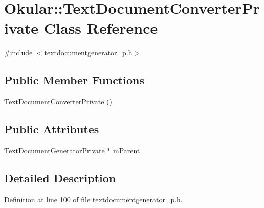 \hypertarget{classOkular_1_1TextDocumentConverterPrivate}{\section{Okular\+:\+:Text\+Document\+Converter\+Private Class Reference}
\label{classOkular_1_1TextDocumentConverterPrivate}
}


{\ttfamily \#include $<$textdocumentgenerator\+\_\+p.\+h$>$}

\subsection*{Public Member Functions}
\begin{DoxyCompactItemize}
\item 
\hyperlink{classOkular_1_1TextDocumentConverterPrivate_a6c94f8416d81482b98d16efd1202a939}{Text\+Document\+Converter\+Private} ()
\end{DoxyCompactItemize}
\subsection*{Public Attributes}
\begin{DoxyCompactItemize}
\item 
\hyperlink{classOkular_1_1TextDocumentGeneratorPrivate}{Text\+Document\+Generator\+Private} $\ast$ \hyperlink{classOkular_1_1TextDocumentConverterPrivate_ad5ad65de1ddc666829e02e12c2bf9c3a}{m\+Parent}
\end{DoxyCompactItemize}


\subsection{Detailed Description}


Definition at line 100 of file textdocumentgenerator\+\_\+p.\+h.



